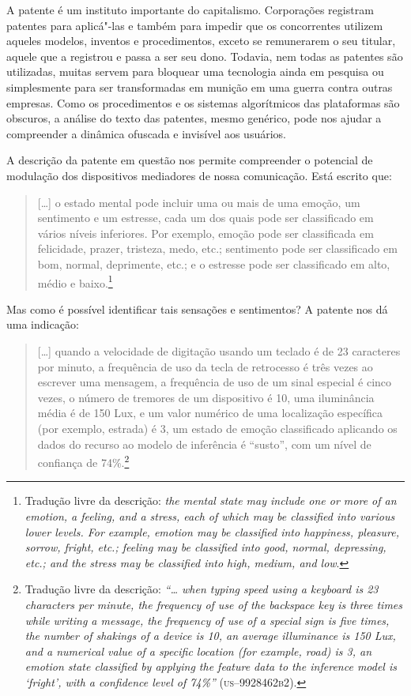 A patente é um instituto importante do capitalismo. Corporações
registram patentes para aplicá"-las e também para impedir que os
concorrentes utilizem aqueles modelos, inventos e procedimentos, exceto
se remunerarem o seu titular, aquele que a registrou e passa a ser seu
dono. Todavia, nem todas as patentes são utilizadas, muitas servem para
bloquear uma tecnologia ainda em pesquisa ou simplesmente para ser
transformadas em munição em uma guerra contra outras empresas. Como os
procedimentos e os sistemas algorítmicos das plataformas são obscuros, a
análise do texto das patentes, mesmo genérico, pode nos ajudar a
compreender a dinâmica ofuscada e invisível aos usuários.

A descrição da patente em questão nos permite compreender o potencial de
modulação dos dispositivos mediadores de nossa comunicação. Está escrito
que:

\begin{quote}
{[}\ldots{}{]} o estado mental pode incluir uma ou mais de uma emoção, um
sentimento e um estresse, cada um dos quais pode ser classificado em
vários níveis inferiores. Por exemplo, emoção pode ser classificada em
felicidade, prazer, tristeza, medo, etc.; sentimento pode ser
classificado em bom, normal, deprimente, etc.; e o estresse pode ser
classificado em alto, médio e baixo.\footnote{Tradução livre da
  descrição: \emph{the mental state may include one or more of an emotion, a
    feeling, and a stress, each of which may be classified into various
    lower levels. For example, emotion may be classified into happiness,
    pleasure, sorrow, fright, etc.; feeling may be classified into good,
    normal, depressing, etc.; and the stress may be classified into high,
    medium, and low}.}
\end{quote}

Mas como é possível identificar tais sensações e sentimentos? A patente
nos dá uma indicação:

\begin{quote}
{[}\ldots{}{]} quando a velocidade de digitação usando um teclado é de 23
caracteres por minuto, a frequência de uso da tecla de retrocesso é três
vezes ao escrever uma mensagem, a frequência de uso de um sinal especial
é cinco vezes, o número de tremores de um dispositivo é 10, uma
iluminância média é de 150 Lux, e um valor numérico de uma localização
específica (por exemplo, estrada) é 3, um estado de emoção classificado
aplicando os dados do recurso ao modelo de inferência é ``susto'', com
um nível de confiança de 74\%.\footnote{Tradução livre da descrição:
  \emph{``\ldots{} when typing speed using a keyboard is 23 characters per
    minute, the frequency of use of the backspace key is three times while
    writing a message, the frequency of use of a special sign is five
    times, the number of shakings of a device is 10, an average
    illuminance is 150 Lux, and a numerical value of a specific location
    (for example, road) is 3, an emotion state classified by applying the
    feature data to the inference model is `fright', with a confidence
    level of 74\%''} (\textsc{us--9928462b2}).} 
\end{quote}

